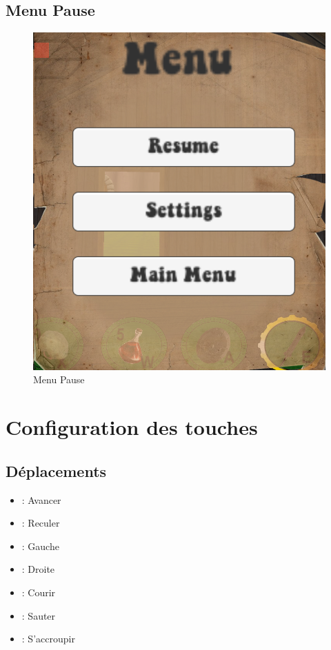 \documentclass[a4paper, 11pt]{article}
\begin{document}
	\subsection{Menu Pause}
	\begin{figure}[!ht]
		\centering
		\includegraphics[scale=0.25]{images/pause.png}
		\caption{Menu Pause}
	\end{figure}
	
	\clearpage
	\section{Configuration des touches}
	\subsection{Déplacements}
	\begin{itemize}
		\item {} : Avancer
		\item {} : Reculer
		\item {} : Gauche
		\item {} : Droite
		\item {} : Courir
		\item {} : Sauter
		\item {} : S'accroupir
	\end{itemize}
	
\end{document}

